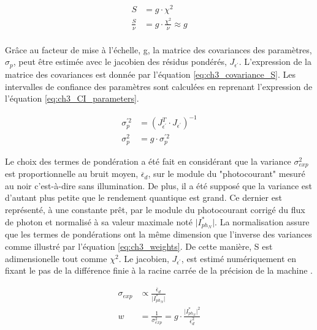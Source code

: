 \begin{refsection}
    \begin{equation}
        \begin{split}
            S &= g \cdot \chi ^2 \\
            \frac{S}{\nu} &= g \cdot \frac{\chi^2}{\nu} \approx g\\
        \end{split}
        \label{eq:ch3_S_vs_X2}
    \end{equation}

    Grâce au facteur de mise à l'échelle, g, la matrice des covariances des paramètres, $\sigma _p$, peut être estimée avec le jacobien des
    résidus pondérés, $J_{\epsilon ^{\prime}}$. L'expression de la matrice des covariances est donnée par l'équation
    \ref{eq:ch3_covariance_S}. Les intervalles de confiance des paramètres sont calculées en reprenant l'expression de
    l'équation \ref{eq:ch3_CI_parameters}.    
    
    \begin{equation}
        \begin{split}
            \sigma _p ^{\prime 2} &= (J_{\epsilon^{\prime}}^T \cdot J_{\epsilon^{\prime}})^{-1} \\
            \sigma _p ^2 &= g \cdot \sigma _p ^{\prime 2}
        \end{split}    
        \label{eq:ch3_covariance_S}
    \end{equation}

    Le choix des termes de pondération a été fait en considérant que la variance $\sigma _{exp}^2$ est proportionnelle
    au bruit moyen, $\overline{\epsilon}_d$, sur le module du "photocourant" mesuré au noir c'est-à-dire sans illumination. De plus, il a été
    supposé que la variance est d'autant plus petite que le rendement quantique est grand. Ce dernier est représenté, à une
    constante prêt, par le module du photocourant corrigé du flux de photon et normalisé à sa valeur
    maximale noté $\vert I_{ph_N}^{\ast} \vert$.     
    La normalisation assure que les termes de pondérations ont la même dimension que l'inverse des
    variances comme illustré par l'équation \ref{eq:ch3_weights}. De cette manière, S est adimensionelle tout comme $\chi ^2$.
    Le jacobien, $J_{\epsilon ^{\prime}}$, est estimé numériquement en fixant le pas de la différence finie à la racine
    carrée de la précision de la machine \citep{Nocedal2006, Press2007}. 

    \begin{equation}
        \begin{split}
            \sigma _{exp} & \propto \frac{\overline{\epsilon}_d}{\vert I_{ph_N}^{\ast} \vert }\\
            w &= \frac{1}{\sigma _{exp}^2} = g \cdot \frac{\vert I_{ph_N}^{\ast} \vert ^2}{\overline{\epsilon}_d^2}
        \end{split}    
        \label{eq:ch3_weights}
    \end{equation}


\end{refsection}
